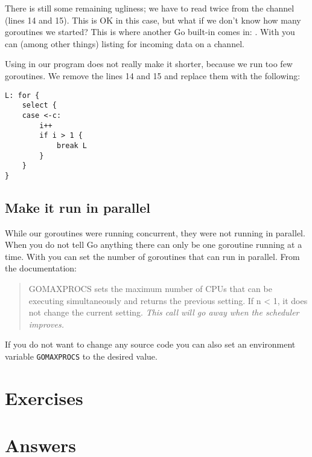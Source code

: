 \showremarks
There is still some remaining ugliness; we have to read twice from
the channel (lines 14 and 15). This is OK in this case, but what if
we don't know how many goroutines we started? This is where another
Go built-in comes in: . With  you 
can (among other things) listing for incoming data on a channel.

Using  in our program does not really make it shorter,
because we run too few goroutines. We remove the lines 14 and 15 and
replace them with the following:
\begin{lstlisting}[caption=Using \key{select},numbers=right,firstnumber=14]
L: for {
	select {
	case <-c:
		i++ 
		if i > 1 { 
			break L
		}   
	}   
}   
\end{lstlisting}


\subsection{Make it run in parallel}
While our goroutines were running concurrent, they were not running in
parallel. When you do not tell Go anything there can only be one
goroutine running at a time. With  you
can set the number of goroutines that can run in parallel. From
the documentation:
\begin{quote}
GOMAXPROCS sets the maximum number of CPUs that can be executing
simultaneously and returns the previous setting. If n < 1, it does not
change the current setting. \emph{This call will go away when the scheduler
improves.}
\end{quote}
If you do not want to change any source code you can also set an
environment variable \verb|GOMAXPROCS| to the desired value.

\section{Exercises}




\cleardoublepage
\section{Answers}
\shipoutAnswer

